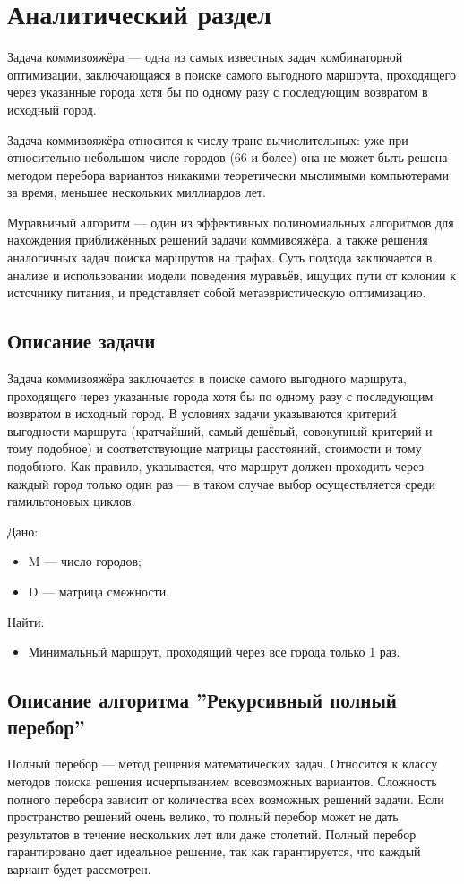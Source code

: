 \chapter{Аналитический раздел}
Задача коммивояжёра — одна из самых известных задач комбинаторной оптимизации, заключающаяся в поиске самого выгодного маршрута, проходящего через указанные города хотя бы по одному разу с последующим возвратом в исходный город.

Задача коммивояжёра относится к числу транс вычислительных: уже при относительно небольшом числе городов (66 и более) она не может быть решена методом перебора вариантов никакими теоретически мыслимыми компьютерами за время, меньшее нескольких миллиардов лет.

Муравьиный алгоритм — один из эффективных полиномиальных алгоритмов для нахождения приближённых решений задачи коммивояжёра, а также решения аналогичных задач поиска маршрутов на графах. Суть подхода заключается в анализе и использовании модели поведения муравьёв, ищущих пути от колонии к источнику питания, и представляет собой метаэвристическую оптимизацию.

\section{Описание задачи}
Задача коммивояжёра заключается в поиске самого выгодного маршрута, проходящего через указанные города хотя бы по одному разу с последующим возвратом в исходный город. В условиях задачи указываются критерий выгодности маршрута (кратчайший, самый дешёвый, совокупный критерий и тому подобное) и соответствующие матрицы расстояний, стоимости и тому подобного. Как правило, указывается, что маршрут должен проходить через каждый город только один раз — в таком случае выбор осуществляется среди гамильтоновых циклов.

Дано:
\begin{itemize}
	\item M — число городов;
	\item D — матрица смежности.
\end{itemize}
Найти:
\begin{itemize}
	\item Минимальный маршрут, проходящий через все города только 1 раз.
\end{itemize}

\section{Описание алгоритма ''Рекурсивный полный перебор''}
Полный перебор — метод решения математических задач. Относится к классу методов поиска решения исчерпыванием всевозможных вариантов. Сложность полного перебора зависит от количества всех возможных решений задачи. Если пространство решений очень велико, то полный перебор может не дать результатов в течение нескольких лет или даже столетий. Полный перебор гарантировано дает идеальное решение, так как гарантируется, что каждый вариант будет рассмотрен.


